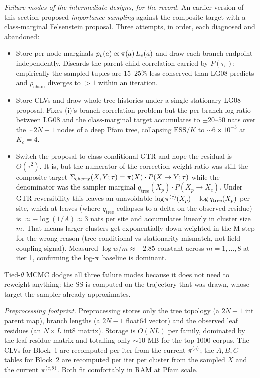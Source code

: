 \emph{Failure modes of the intermediate designs, for the record.} An
earlier version of this section proposed
\emph{importance sampling} against the composite target with a
class-marginal Felsenstein proposal. Three attempts, in order, each
diagnosed and abandoned:
\begin{itemize}
  \item[(i)] Store per-node marginals $p_v(a) \propto \pi(a)\,L_v(a)$
    and draw each branch endpoint independently. Discards the parent-child
    correlation carried by $P(\tau_v)$; empirically the sampled tuples
    are $15$--$25\%$ less conserved than LG08 predicts and
    $\rho_{\mathrm{chain}}$ diverges to $> 1$ within an iteration.
  \item[(ii)] Store CLVs and draw whole-tree histories under a
    single-stationary LG08 proposal. Fixes (i)'s branch-correlation
    problem but the per-branch log-ratio between LG08 and the
    class-marginal target accumulates to $\pm 20$--$50$ nats over the
    $\sim\!2N{-}1$ nodes of a deep Pfam tree, collapsing
    $\mathrm{ESS}/K$ to $\sim\!6 \times 10^{-3}$ at $K_c = 4$.
  \item[(iii)] Switch the proposal to class-conditional GTR and hope
    the residual is $O(\tau^2)$. It is, but the numerator of the
    correction weight ratio was still the composite target
    $\Sigma_{\mathrm{cherry}}(X, Y; \tau) = \pi(X) \cdot P(X \to Y; \tau)$
    while the denominator was the sampler marginal $q_{\mathrm{tree}}(X_p)
    \cdot P(X_p \to X_c)$. Under GTR reversibility this leaves an
    unavoidable $\log \pi^{(c)}(X_p) - \log q_{\mathrm{tree}}(X_p)$ per
    site, which at leaves (where $q_{\mathrm{tree}}$ collapses to a
    delta on the observed residue) is $\approx -\log(1/A) \approx 3$
    nats per site and accumulates linearly in cluster size $m$. That
    means larger clusters get exponentially down-weighted in the M-step
    for the wrong reason (tree-conditional vs stationarity mismatch,
    not field-coupling signal). Measured
    $\log w /m \approx -2.85$ constant across $m = 1, \dots, 8$ at
    iter 1, confirming the log-$\pi$ baseline is dominant.
\end{itemize}
Tied-$\theta$ MCMC dodges all three failure modes because it does not
need to reweight anything: the SS is computed on the trajectory that
was drawn, whose target the sampler already approximates.

\emph{Preprocessing footprint.} Preprocessing stores only the tree
topology (a $2N{-}1$ int parent map), branch lengths (a
$2N{-}1$ float64 vector) and the observed leaf residues (an
$N \times L$ int8 matrix). Storage is $O(N L)$ per family, dominated by
the leaf-residue matrix and totalling only $\sim\!10$ MB for the
top-1000 corpus. The CLVs for Block~1 are recomputed per iter from the
current $\pi^{(c)}$; the $A, B, C$ tables for Block~2 are recomputed
per iter per cluster from the sampled $X$ and the current
$\pi^{(c, \theta)}$. Both fit comfortably in RAM at Pfam scale.

